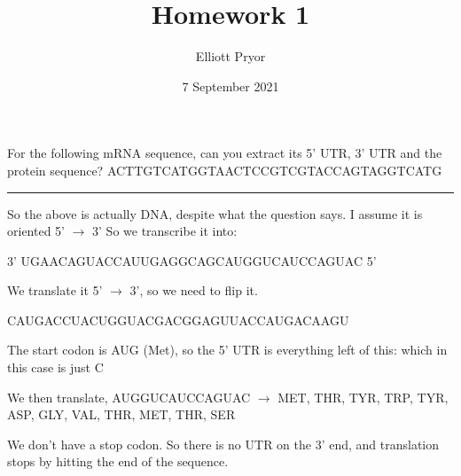 \documentclass[11pt]{article}
\title{Homework 1}
\author{Elliott Pryor}
\date{7 September 2021}
\begin{document}
\maketitle


For the following mRNA sequence, can you extract its 5’ UTR, 3’ UTR
and the protein sequence?
ACTTGTCATGGTAACTCCGTCGTACCAGTAGGTCATG

\hrule

So the above is actually DNA, despite what the question says. I assume it is oriented 5' $\rightarrow$ 3' 
So we transcribe it into:

3' UGAACAGUACCAUUGAGGCAGCAUGGUCAUCCAGUAC 5'

We translate it 5' $\rightarrow$ 3', so we need to flip it.

CAUGACCUACUGGUACGACGGAGUUACCAUGACAAGU

The start codon is AUG (Met), so the 5' UTR is everything left of this: which in this case is just C

We then translate,
AUGGUCAUCCAGUAC $\rightarrow$ MET, THR, TYR, TRP, TYR, ASP, GLY, VAL, THR, MET, THR, SER

We don't have a stop codon. So there is no UTR on the 3' end, and translation stops by hitting the end of the sequence.
\end{document}
